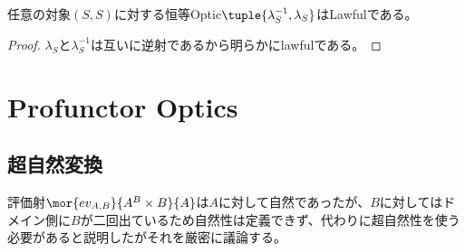 \documentclass[uplatex,dvipdfmx]{jsarticle}
\begin{document}
  \begin{prop}[恒等Opticのlawful性]  
    任意の対象$(S,S)$に対する恒等Optic$\tuple{\lambda_S^{-1},\lambda_S}$はLawfulである。
  \end{prop}
  \begin{proof}
    $\lambda_S$と$\lambda_S^{-1}$は互いに逆射であるから明らかにlawfulである。
  \end{proof}
  \section{Profunctor Optics}
  \subsection{超自然変換}
  評価射$\mor{ev_{A,B}}{A^B\times B}{A}$は$A$に対して自然であったが、$B$に対してはドメイン側に$B$が二回出ているため自然性は定義できず、代わりに超自然性を使う必要があると説明したがそれを厳密に議論する。
\end{document}
